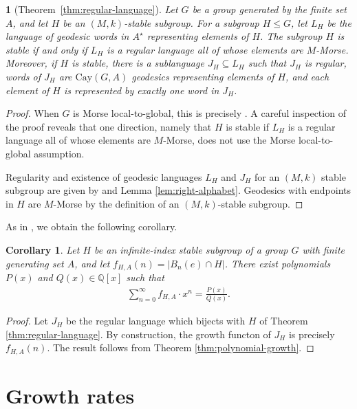 \documentclass[11pt,letterpaper]{amsart}
\newtheorem{corollary}[theorem]{Corollary}
\theoremstyle{definition}
\theoremstyle{plain}
\theoremstyle{TheoremNum}
\newtheorem{duplicate}{}
\begin{document}
\begin{duplicate}[Theorem~\ref{thm:regular-language}]
    Let $G$ be a group generated by the finite set $A$, and let $H$ be an $(M,k)$-stable subgroup. For a subgroup $H \leq G$, let $L_H$ be the language of geodesic words in $A^{\star}$ representing elements of $H$. The subgroup $H$ is stable if and only if $L_H$ is a regular language all of whose elements are $M$-Morse. Moreover, if $H$ is stable, there is a sublanguage $J_H \subseteq L_H$ such that $J_H$ is regular, words of $J_H$ are $\text{Cay}(G,A)$ geodesics representing elements of $H$, and each element of $H$ is represented by exactly one word in $J_H$.
\end{duplicate}
    \begin{proof}
        When $G$ is Morse local-to-global, this is precisely \cite[Theorem~E]{CRSZ}. A careful inspection of the proof reveals that one direction, namely that $H$ is stable if $L_H$ is a regular language all of whose elements are $M$-Morse, does not use the Morse local-to-global assumption.
        
        Regularity and existence of geodesic languages $L_H$ and $J_H$ for an $(M,k)$ stable subgroup are given by \cite[Theorem~6.7]{DFW} and Lemma \ref{lem:right-alphabet}. Geodesics with endpoints in $H$ are $M$-Morse by the definition of an $(M,k)$-stable subgroup.
    \end{proof}

As in \cite{CRSZ}, we obtain the following corollary.
\begin{corollary}
    Let $H$ be an infinite-index stable subgroup of a group $G$ with finite generating set $A$, and let $f_{H,A}(n) = |B_n(e) \cap H|$. There exist polynomials $P(x)$ and $Q(x) \in \mathbb{Q}[x]$ such that 
    \begin{align*}
        \sum_{n=0}^{\infty} f_{H,A} \cdot x^n = \frac{P(x)}{Q(x)}\text{.}
    \end{align*}
\end{corollary}
\begin{proof}
    Let $J_H$ be the regular language which bijects with $H$ of Theorem \ref{thm:regular-language}. By construction, the growth functon of $J_H$ is precisely $f_{H,A}(n)$. The result follows from Theorem \ref{thm:polynomial-growth}.
\end{proof}

\section{Growth rates}
\end{document}
